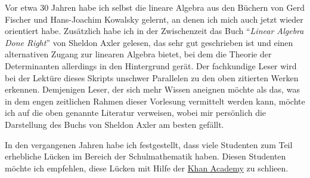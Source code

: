 Vor etwa 30 Jahren habe ich selbst die lineare Algebra aus den B\"{u}chern von Gerd Fischer
\cite{fischer:2008} und Hans-Joachim Kowalsky \cite{kowalsky:2003} gelernt, an denen ich mich auch
jetzt wieder orientiert habe.  Zus\"{a}tzlich habe ich in der Zwischenzeit das Buch 
``\emph{Linear Algebra Done Right}'' von Sheldon Axler \cite{axler:1997} gelesen, das sehr gut geschrieben ist
und einen alternativen Zugang zur linearen Algebra bietet, bei dem die Theorie der Determinanten
allerdings in den Hintergrund ger\"{a}t.  Der fachkundige Leser wird bei der Lekt\"{u}re dieses Skripts
unschwer Parallelen zu den oben zitierten Werken erkennen.   Demjenigen Leser, der sich mehr Wissen
aneignen m\"{o}chte als das, was in dem engen zeitlichen Rahmen dieser Vorlesung vermittelt werden kann,
m\"{o}chte ich auf die oben genannte Literatur verweisen, wobei mir pers\"{o}nlich die Darstellung des Buchs
von Sheldon Axler am besten gef\"{a}llt. 

In den vergangenen Jahren habe ich festgestellt, dass viele Studenten zum Teil erhebliche L\"{u}cken im Bereich der
Schulmathematik haben.  Diesen Studenten m\"{o}chte ich empfehlen, diese L\"{u}cken mit Hilfe der 
\href{https://www.khanacademy.org}{Khan Academy} zu schlie\3en.  

